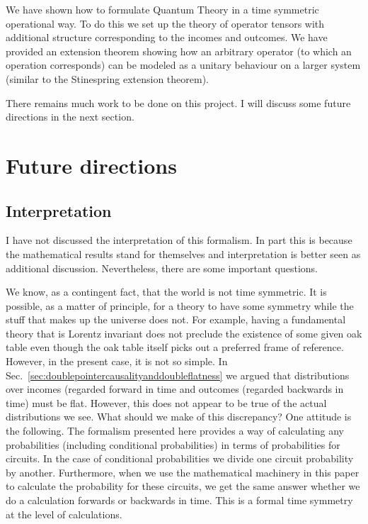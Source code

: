 \documentclass[10pt]{article}
\begin{document}
We have shown how to formulate Quantum Theory in a time symmetric operational way.  To do this we set up the theory of operator tensors with additional structure corresponding to the incomes and outcomes.  We have provided an extension theorem showing how an arbitrary operator (to which an operation corresponds) can be modeled as a unitary behaviour on a larger system (similar to the Stinespring extension theorem).




There remains much work to be done on this project.  I will discuss some future directions in the next section.


\section{Future directions}

\subsection{Interpretation}\label{sec:interpretation}

I have not discussed the interpretation of this formalism.  In part this is because the mathematical results stand for themselves and interpretation is better seen as additional discussion.  Nevertheless, there are some important questions.

We know, as a contingent fact, that the world is not time symmetric.  It is possible, as a matter of principle, for a theory to have some symmetry while the stuff that makes up the universe does not. For example, having a fundamental theory that is Lorentz invariant does not preclude the existence of some given oak table even though the oak table itself picks out a preferred frame of reference.  However, in the present case, it is not so simple.  In Sec.\ \ref{sec:doublepointercausalityanddoubleflatness} we argued that distributions over incomes (regarded forward in time and outcomes (regarded backwards in time) must be flat.  However, this does not appear to be true of the actual distributions we see.  What should we make of this discrepancy?  One attitude is the following. The formalism presented here provides a way of calculating any probabilities (including conditional probabilities) in terms of probabilities for circuits.  In the case of conditional probabilities we divide one circuit probability by another.  Furthermore, when we use the mathematical machinery in this paper to calculate the probability for these circuits, we get the same answer whether we do a calculation forwards or backwards in time.  This is a formal time symmetry at the level of calculations.
\end{document}

